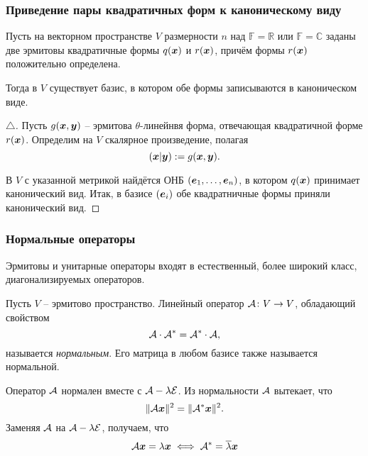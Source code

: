 
\subsubsection{Приведение пары квадратичных форм к каноническому виду}

\begin{to_thr} 
    Пусть на векторном пространстве $V$ размерности $n$ над $\mathbb{F} = \mathbb{R}$ или $\mathbb{F} = \mathbb{C}$ заданы две эрмитовы квадратичные формы $q(\mbox{\boldmath $x$})$ и $r(\mbox{\boldmath $x$})$, причём формы $r(\mbox{\boldmath $x$})$ положительно определена.

    Тогда в $V$ существует базис, в котором обе формы записываются в каноническом виде. 
\end{to_thr}

\begin{proof}[$\triangle$]
    Пусть $g(\mbox{\boldmath $x$}, \mbox{\boldmath $y$})$ -- эрмитова $\theta$-линейнвя форма, отвечающая квадратичной форме $r(\mbox{\boldmath $x$})$. Определим на $V$ скалярное произведение, полагая
    $$
        (\mbox{\boldmath $x$} | \mbox{\boldmath $y$}) := g(\mbox{\boldmath $x$}, \mbox{\boldmath $y$}).
    $$

    В $V$ с указанной метрикой найдётся ОНБ $(\mbox{\boldmath $e$}_{1}, \ldots, \mbox{\boldmath $e$}_n)$, в котором $q(\mbox{\boldmath $x$})$ принимает канонический вид. Итак, в базисе $(\mbox{\boldmath $e$}_i)$ обе квадратничные формы приняли канонический вид.
\end{proof}


\subsubsection{Нормальные операторы}
Эрмитовы и унитарные операторы входят в естественный, более широкий класс, диагонализируемых операторов.

\begin{to_def} 
    Пусть $V$ -- эрмитово пространство. Линейный оператор $\mathcal A \colon V \to V$, обладающий свойством 
    $$
        \mathcal A \cdot \mathcal A^* = \mathcal A^* \cdot \mathcal A,
    $$
    называется \textit{нормальным}. Его матрица в любом базисе также называется нормальной.
\end{to_def}

Оператор $\mathcal A$ нормален вместе с $\mathcal A - \lambda \mathcal E$. Из нормальности $\mathcal A$ вытекает, что 
$$
    \|\mathcal A \mbox{\boldmath $x$} \|^2 = \|\mathcal A^* \mbox{\boldmath $x$}\|^2.
$$
Заменяя $\mathcal A$ на $\mathcal A - \lambda \mathcal E$, получаем, что
\begin{equation}
\label{13eq}
    \mathcal A \mbox{\boldmath $x$} = \lambda \mbox{\boldmath $x$} \; \Longleftrightarrow \; \mathcal A^* = \overline{\lambda} \mbox{\boldmath $x$}
\end{equation}



